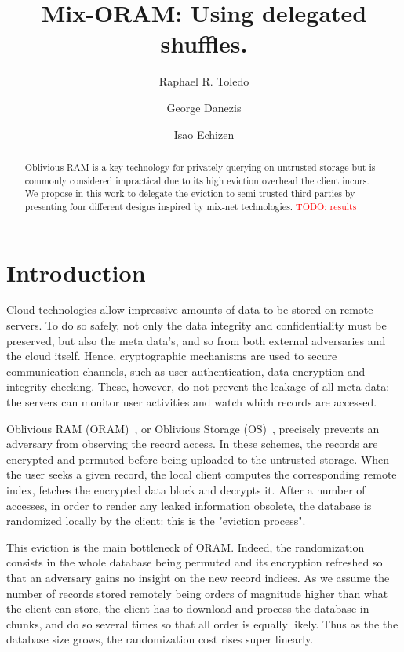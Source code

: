 \documentclass{llncs}
\newcommand{\todo}[1]{\textcolor{red}{TODO: #1}}
\begin{document}
\title{Mix-ORAM: Using delegated shuffles.}

\author{   Raphael R. Toledo  \and George Danezis  \and Isao Echizen}

\maketitle

\begin{abstract}
Oblivious RAM is a key technology for privately querying on untrusted storage but is commonly considered impractical due to its high eviction overhead the client incurs. We propose in this work to delegate the eviction to semi-trusted third parties by presenting four different designs inspired by mix-net technologies. \todo{results}
\end{abstract}

\section{Introduction}

Cloud technologies allow impressive amounts of data to be stored on remote servers. To do so safely, not only the data integrity and confidentiality must be preserved, but also the meta data's, and so from both external adversaries and the cloud itself.
Hence, cryptographic mechanisms are used to secure communication channels, such as user authentication, data encryption and integrity checking.
These, however, do not prevent the leakage of all meta data: the servers can monitor user activities and watch which records are accessed.

Oblivious RAM (ORAM)~\cite{goldreich87}, or Oblivious Storage (OS)~\cite{boneh2011}, precisely prevents an adversary from observing the record access. In these schemes, the records are encrypted and permuted before being uploaded to the untrusted storage. When the user seeks a given record, the local client computes the corresponding remote index, fetches the encrypted data block and decrypts it. After a number of accesses, in order to render any leaked information obsolete, the database is randomized locally by the client: this is the "eviction process".

This eviction is the main bottleneck of ORAM. Indeed, the randomization consists in the whole database being permuted and its encryption refreshed so that an adversary gains no insight on the new record indices. As we assume the number of records stored remotely being orders of magnitude higher than what the client can store, the client has to download and process the database in chunks, and do so several times so that all order is equally likely. Thus as the the database size grows, the randomization cost rises super linearly.
\end{document}
